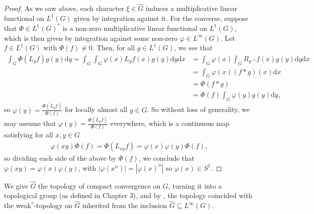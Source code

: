 \documentclass[10pt,twoside,openany,final]{memoir}
\theoremstyle{definition}
\theoremstyle{Break}
\renewcommand{\d}{\mathrm{d}}
\begin{document}
\begin{proof}
	As we saw above, each character $\xi \in \widehat{G}$ induces a multiplicative linear functional on $L^1(G)$ given by integration against it. For the converse, suppose that $\Phi \in L^1(G)^*$ is a non-zero multiplicative linear functional on $L^1(G)$, which is then given by integration against some non-zero $\varphi \in L^\infty(G)$. Let $f \in L^1(G)$ with $\Phi(f)\neq 0$. Then, for all $g \in L^1(G)$, we see that
\begin{align*}
		\int_G \Phi(L_y f) g(y) \d y = \int_G \int_G \varphi(x) L_y f(x) g(y) \d y \d x&= \int_G \varphi(x) \int_G  R_{y^{-1}}f(x) g(y) \d y \d x \\
	&= \int_G \varphi(x) (f \ast g)(x) \d x \\
	&= \Phi(f \ast g)\\
	&=\Phi(f) \int_G \varphi(y) g(y) \d y,
\end{align*}
so $\varphi(y)=\frac{\Phi(L_y f)}{\Phi(f)}$ for locally almost all $y \in G$. So without loss of generality, we may assume that $\varphi(y)=\frac{\Phi(L_y f)}{\Phi(f)}$ everywhere, which is a continuous map satisfying for all $x,y \in G$
\begin{align*}
	\varphi(xy)\Phi(f)=\Phi(L_{xy}f)=\varphi(x)\varphi(y)\Phi(f),
\end{align*}
so dividing each side of the above by $\Phi(f)$, we conclude that $\varphi(xy)=\varphi(x)\varphi(y)$, with $|\varphi(x^n)|=|\varphi(x)^n|$ so $\varphi(x) \in S^1$.
\end{proof}
We give $\widehat{G}$ the topology of compact convergence on $G$, turning it into a topological group (as defined in Chapter 3), and by , the topology coincided with the weak$^*$-topology on $\widehat{G}$ inherited from the inclusion $\widehat{G} \subseteq L^\infty(G)$. 
\end{document}

